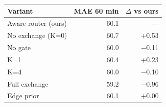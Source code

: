 \begin{tabular}{lrr}
\toprule
Variant & MAE 60 min & $\Delta$ vs ours \\
\midrule
Aware router (ours) & 60.1 & --- \\
\midrule
No exchange (K=0) & 60.7 & +0.53 \\
No gate & 60.0 & $-$0.11 \\
K=1 & 60.4 & +0.23 \\
K=4 & 60.0 & $-$0.10 \\
Full exchange & 59.2 & $-$0.96 \\
Edge prior & 60.1 & +0.00 \\
\bottomrule
\end{tabular}

